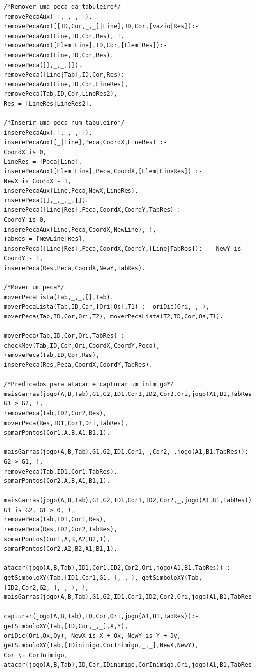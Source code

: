 \documentclass[a4paper]{article}
\begin{document}
\begin{lstlisting}
/*Remover uma peca da tabuleiro*/
removePecaAux([],_,_,[]).
removePecaAux([[ID,Cor,_,_]|Line],ID,Cor,[vazio|Res]):- removePecaAux(Line,ID,Cor,Res), !.
removePecaAux([Elem|Line],ID,Cor,[Elem|Res]):- removePecaAux(Line,ID,Cor,Res).
removePeca([],_,_,[]).
removePeca([Line|Tab],ID,Cor,Res):-
removePecaAux(Line,ID,Cor,LineRes),
removePeca(Tab,ID,Cor,LineRes2),
Res = [LineRes|LineRes2].

/*Inserir uma peca num tabuleiro*/
inserePecaAux([],_,_,[]).
inserePecaAux([_|Line],Peca,CoordX,LineRes) :-
CoordX is 0,
LineRes = [Peca|Line].
inserePecaAux([Elem|Line],Peca,CoordX,[Elem|LineRes]) :-
NewX is CoordX - 1,
inserePecaAux(Line,Peca,NewX,LineRes).
inserePeca([],_,_,_,[]).
inserePeca([Line|Res],Peca,CoordX,CoordY,TabRes) :-
CoordY is 0,
inserePecaAux(Line,Peca,CoordX,NewLine), !,
TabRes = [NewLine|Res].
inserePeca([Line|Res],Peca,CoordX,CoordY,[Line|TabRes]):-   NewY is CoordY - 1,
inserePeca(Res,Peca,CoordX,NewY,TabRes).

/*Mover um peca*/
moverPecaLista(Tab,_,_,[],Tab).
moverPecaLista(Tab,ID,Cor,[Ori|Os],T1) :- oriDic(Ori,_,_), moverPeca(Tab,ID,Cor,Ori,T2), moverPecaLista(T2,ID,Cor,Os,T1).

moverPeca(Tab,ID,Cor,Ori,TabRes) :-
checkMov(Tab,ID,Cor,Ori,CoordX,CoordY,Peca),
removePeca(Tab,ID,Cor,Res),
inserePeca(Res,Peca,CoordX,CoordY,TabRes).

/*Predicados para atacar e capturar um inimigo*/
maisGarras(jogo(A,B,Tab),G1,G2,ID1,Cor1,ID2,Cor2,Ori,jogo(A1,B1,TabRes)):-
G1 > G2, !,
removePeca(Tab,ID2,Cor2,Res),
moverPeca(Res,ID1,Cor1,Ori,TabRes),
somarPontos(Cor1,A,B,A1,B1,1).

maisGarras(jogo(A,B,Tab),G1,G2,ID1,Cor1,_,Cor2,_,jogo(A1,B1,TabRes)):-
G2 > G1, !,
removePeca(Tab,ID1,Cor1,TabRes),
somarPontos(Cor2,A,B,A1,B1,1).

maisGarras(jogo(A,B,Tab),G1,G2,ID1,Cor1,ID2,Cor2,_,jogo(A1,B1,TabRes)):-
G1 is G2, G1 > 0, !,
removePeca(Tab,ID1,Cor1,Res),
removePeca(Res,ID2,Cor2,TabRes),
somarPontos(Cor1,A,B,A2,B2,1),
somarPontos(Cor2,A2,B2,A1,B1,1).

atacar(jogo(A,B,Tab),ID1,Cor1,ID2,Cor2,Ori,jogo(A1,B1,TabRes)) :- getSimboloXY(Tab,[ID1,Cor1,G1,_],_,_), getSimboloXY(Tab,[ID2,Cor2,G2,_],_,_), !, maisGarras(jogo(A,B,Tab),G1,G2,ID1,Cor1,ID2,Cor2,Ori,jogo(A1,B1,TabRes)).

capturar(jogo(A,B,Tab),ID,Cor,Ori,jogo(A1,B1,TabRes)):-
getSimboloXY(Tab,[ID,Cor,_,_],X,Y),
oriDic(Ori,Ox,Oy), NewX is X + Ox, NewY is Y + Oy,
getSimboloXY(Tab,[IDinimigo,CorInimigo,_,_],NewX,NewY),
Cor \= CorInimigo,
atacar(jogo(A,B,Tab),ID,Cor,IDinimigo,CorInimigo,Ori,jogo(A1,B1,TabRes)).


\end{lstlisting}
\end{document}
